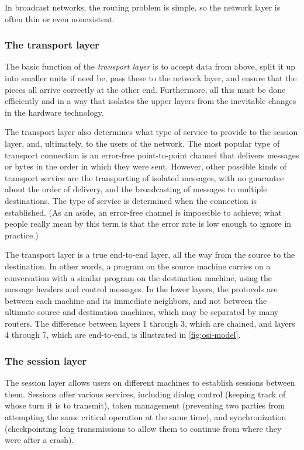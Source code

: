 In broadcast networks, the routing problem is simple, so the network
layer is often thin or even nonexistent.



\subsubsection{The transport layer}

The basic function of the \emph{transport layer} is to accept data from
above, split it up into smaller units if need be, pass these to the
network layer, and ensure that the pieces all arrive correctly at the
other end. Furthermore, all this must be done efficiently and in a way
that isolates the upper layers from the inevitable changes in the
hardware technology.

The transport layer also determines what type of service to provide to
the session layer, and, ultimately, to the users of the network. The
most popular type of transport connection is an error-free
point-to-point channel that delivers messages or bytes in the order in
which they were sent. However, other possible kinds of transport service
are the transporting of isolated messages, with no guarantee about the
order of delivery, and the broadcasting of messages to multiple
destinations. The type of service is determined when the connection is
established. (As an aside, an error-free channel is impossible to
achieve; what people really mean by this term is that the error rate is
low enough to ignore in practice.)

The transport layer is a true end-to-end layer, all the way from the
source to the destination. In other words, a program on the source
machine carries on a conversation with a similar program on the
destination machine, using the message headers and control messages. In
the lower layers, the protocols are between each machine and its
immediate neighbors, and not between the ultimate source and destination
machines, which may be separated by many routers. The difference between
layers 1 through 3, which are chained, and layers 4 through 7, which are
end-to-end, is illustrated in \vref{fig:osi-model}.


\subsubsection{The session layer}

The session layer allows users on different machines to establish
{sessions} between them. Sessions offer various services, including
{dialog control} (keeping track of whose turn it is to transmit), {token
management} (preventing two parties from attempting the same critical
operation at the same time), and {synchronization} (checkpointing long
transmissions to allow them to continue from where they were after a
crash).


